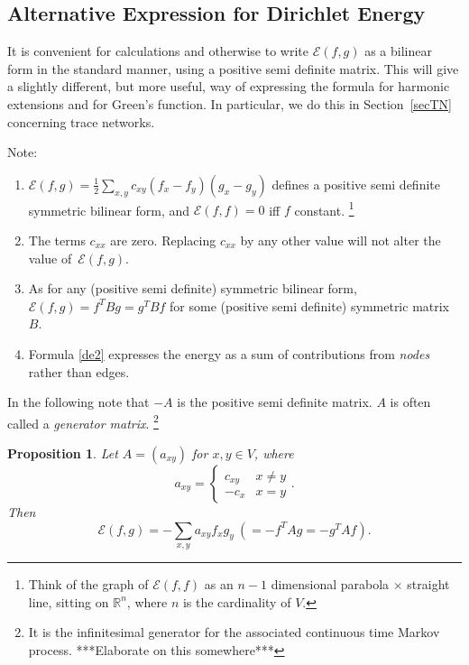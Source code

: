 \documentclass[a4paper]{amsart}
\theoremstyle{plain}
\newtheorem{proposition}[theorem]{Proposition}
\theoremstyle{definition}
\theoremstyle{remark}
\begin{document}

\subsection{Alternative Expression for Dirichlet Energy}

It is convenient for calculations and otherwise to write $ \mathcal{E}(f,g) $ as a bilinear form in the standard manner, using a positive semi definite matrix.  This will give a slightly different, but more useful, way of expressing the formula for harmonic extensions and for Green's function.  In particular, we do this in Section~\ref{secTN} concerning trace networks. 

\medskip Note: 
\begin{enumerate}
\item $ \mathcal{E}(f,g)  = \frac{1}{2} \sum_{x,y} c_{xy} (f_x-f_y)(g_x-g_y)$ defines a positive semi definite symmetric bilinear form, and $ \mathcal{E}(f,f) = 0 $ iff $ f $  constant.%
\footnote{Think of the graph of $ \mathcal{E}(f,f) $ as  an  $ n-1 $ dimensional parabola $ \times $ straight line, sitting on $ \mathbb{R}^n$, where $ n $ is the cardinality of $ V $.}

\item  
The terms $ c_{xx}$ are zero.
 Replacing $ c_{xx} $  by any other value will not alter the value of~$ \mathcal{E}(f,g) $.  
 
 \item As for any (positive semi definite) symmetric bilinear form,   $ \mathcal{E}(f,g) =  f^T B g = g^T B f$ for some (positive semi definite) symmetric matrix $ B $.
 
 \item Formula \eqref{de2} expresses the energy as a sum of contributions from   \emph{nodes} rather than edges.

 \end{enumerate} 
 
  In the following note that $ -A $ is the positive semi definite matrix.
   $ A $ is often called a \emph{generator  matrix}.%
  \footnote{It is the infinitesimal generator for the associated continuous time Markov process.   ***Elaborate on this somewhere***} 
\begin{proposition}
Let $ A = (a_{xy}) $  for $ x,y \in V $, where 
\begin{equation} \label{defA}
a_{xy} = \begin{cases} c_{xy} & x \neq y \\
                                          -c_x   & x = y 
               \end{cases}.
 \end{equation}
Then 
\begin{equation} \label{de2}
\boxed{\mathcal{E}(f,g) = -\sum_{x,y} a_{xy} f_x g_y}  \ (=  -f^TAg = -g^TAf). 
\end{equation} 
\end{proposition} 
\end{document}
